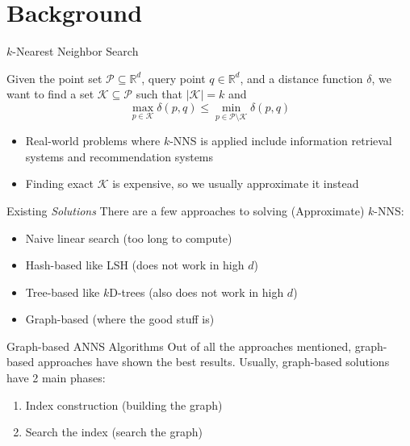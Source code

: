\section{Background}

\frame{\insertsection}

\begin{frame}{\(k\)-Nearest Neighbor Search}
\begin{definition}
    Given the point set \(\mathcal{P} \subseteq \mathbb{R}^d\), query point \(q \in \mathbb{R}^d\), and a distance function \(\delta\), we want to find a set \(\mathcal{K} \subseteq \mathcal{P}\) such that \(|\mathcal{K}| = k\) and
    \[
        \max_{p \in \mathcal{K}} \delta(p, q) \leq \min_{p \in \mathcal{P} \setminus \mathcal{K}} \delta(p, q)
    \]
    \end{definition}
    \begin{itemize}
        \item Real-world problems where \(k\)-NNS is applied include information retrieval systems and recommendation systems
        \item Finding exact \(\mathcal{K}\) is expensive, so we usually approximate it instead
    \end{itemize}
\end{frame}

\begin{frame}{Existing \textit{Solutions}}
    There are a few approaches to solving (Approximate) \(k\)-NNS:
    \begin{itemize}
        \item Naive linear search (too long to compute)
        \item Hash-based like LSH (does not work in high \(d\))
        \item Tree-based like \(k\)D-trees (also does not work in high \(d\))
        \item Graph-based (where the good stuff is)
    \end{itemize}
\end{frame}

\begin{frame}{Graph-based ANNS Algorithms}
    Out of all the approaches mentioned, graph-based approaches have shown the best results. Usually, graph-based solutions have 2 main phases:
    \begin{enumerate}
        \item Index construction (building the graph)
        \item Search the index (search the graph)
    \end{enumerate}
\end{frame}

